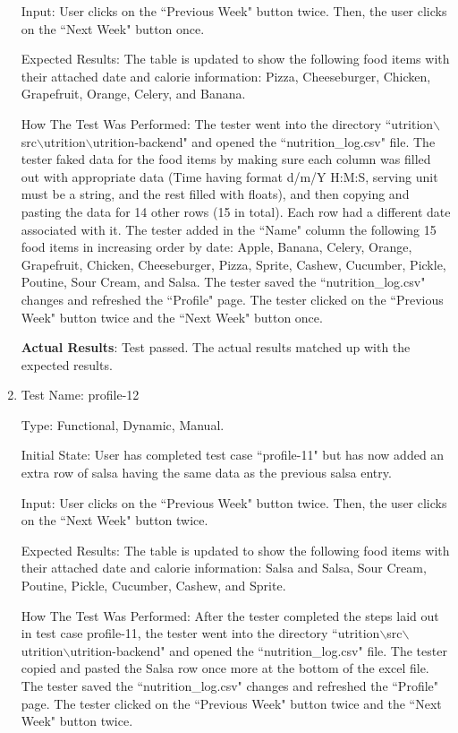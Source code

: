 \documentclass[12pt, titlepage]{article}
\begin{document}
\begin{enumerate}
		Input: User clicks on the ``Previous Week" button twice. Then, the user clicks on the ``Next Week" button once.
		
		Expected Results: The table is updated to show the following food items with their attached date and calorie information: Pizza, Cheeseburger, Chicken, Grapefruit, Orange, Celery, and Banana.
		
		How The Test Was Performed: The tester went into the directory ``utrition$\backslash$src$\backslash$utrition$\backslash$utrition-backend" and opened the ``nutrition\_log.csv" file. The tester faked data for the food items by making sure each column was filled out with appropriate data (Time having format d/m/Y H:M:S, serving unit must be a string, and the rest filled with floats), and then copying and pasting the data for 14 other rows (15 in total). Each row had a different date associated with it. The tester added in the ``Name" column the following 15 food items in increasing order by date: Apple, Banana, Celery, Orange, Grapefruit, Chicken, Cheeseburger, Pizza, Sprite, Cashew, Cucumber, Pickle, Poutine, Sour Cream, and Salsa. The tester saved the ``nutrition\_log.csv" changes and refreshed the ``Profile" page. The tester clicked on the ``Previous Week" button twice and the ``Next Week" button once.
		
		\textbf{Actual Results}: Test passed. The actual results matched up with the expected results.
		
		\item{Test Name: profile-12}
		
		Type: Functional, Dynamic, Manual.
		
		Initial State:  User has completed test case ``profile-11" but has now added an extra row of salsa having the same data as the previous salsa entry.
		
		Input: User clicks on the ``Previous Week" button twice. Then, the user clicks on the ``Next Week" button twice.
		
		Expected Results: The table is updated to show the following food items with their attached date and calorie information: Salsa and Salsa, Sour Cream, Poutine, Pickle, Cucumber, Cashew, and Sprite.
		
		How The Test Was Performed: After the tester completed the steps laid out in test case profile-11, the tester went into the directory ``utrition$\backslash$src$\backslash$utrition$\backslash$utrition-backend" and opened the ``nutrition\_log.csv" file. The tester copied and pasted the Salsa row once more at the bottom of the excel file. The tester saved the ``nutrition\_log.csv" changes and refreshed the ``Profile" page. The tester clicked on the ``Previous Week" button twice and the ``Next Week" button twice.
		

\end{enumerate}
\end{document}
